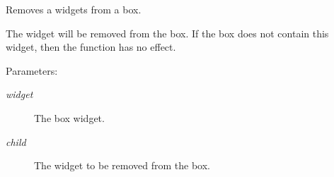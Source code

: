 Removes a widgets from a box. 

The widget will be removed from the box. If the box does not contain this widget, then the function has no effect.

\begin{Desc}
\item[Parameters:]
\begin{description}
\item[{\em widget}]The box widget. \item[{\em child}]The widget to be removed from the box. \end{description}
\end{Desc}
